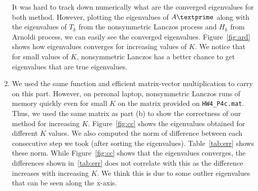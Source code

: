 \begin{enumerate}
It was hard to track down numerically what are the converged eigenvalues for both method. However, plotting the eigenvalues of $A\textprime$ along with the eigenvalues of $T_{k}$ from the nonsymmetric Lanczos process and $H_{k}$ from Arnoldi process, we can easily see the converged eigenvalues. Figure~\ref{fig:ard} shows how eigenvalues converges for increasing values of $K$. We notice that for small values of $K$, nonsymmetric Lanczos has a better chance to get eigenvalues that are true eigenvalues. 

\item We used the same function and efficient matrix-vector multiplication to carry on this part. However, on personal laptop, nonsymmetric Lanczos runs of memory quickly even for small $K$ on the matrix provided on \texttt{HW4\_P4c.mat}. Thus, we used the same matrix as part (b) to show the correctness of our method for increasing $K$. Figure~\ref{fig:cc} shows the eigenvalues obtained for different $K$ values. We also computed the norm of difference between each consecutive step we took (after sorting the eigenvalues). Table~\ref{tab:err} shows these norm. While Figure~\ref{fig:cc} shows that the eigenvalues converges, the differences shown in~\ref{tab:err} does not correlate with this as the difference increases with increasing $K$. We think this is due to some outlier eigenvalues that can be seen along the x-axis. 

\begin{figure}[!tbh]
\centering        
      

\end{figure}
\end{enumerate}
